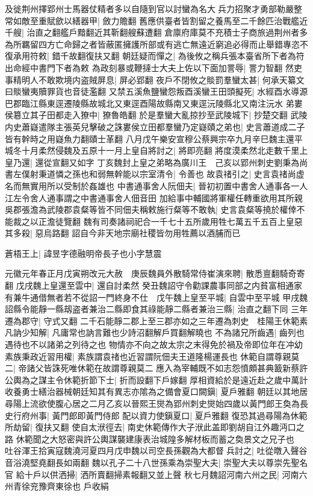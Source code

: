 及徙荆州擇郢州士馬器仗精者多以自隨到官以討蠻為名大兵力招聚才勇部勒嚴整常如敵至重賦歛以繕器甲|{
	斂力贍翻}
舊應供臺者皆割留之養馬至二千餘匹治戰艦近千艘|{
	治直之翻艦戶黯翻近其靳翻艘蘇遭翻}
倉廪府庫莫不充積士子商旅過荆州者多為所羈留四方亡命歸之者皆蔽匿擁護所部或有逃亡無遠近窮追必得而止舉錯專恣不復承用符敕|{
	錯千故翻復扶又翻}
朝廷疑而憚之|{
	為後攸之稱兵張本臺省所下者為符出命經中書門下者為敕}
為政刻暴或鞭撻士大夫上佐以下面加詈辱|{
	詈力智翻}
然吏事精明人不敢欺境内盗賊屏息|{
	屏必郢翻}
夜戶不閉攸之賧罰羣蠻太甚|{
	何承天纂文曰賧蠻夷贖罪貨也音徒濫翻}
又禁五溪魚鹽蠻怨叛酉溪蠻王田頭擬死|{
	水經酉水導源巴郡臨江縣東逕遷陵縣故城北又東逕酉陽故縣南又東逕沅陵縣北又南注沅水}
弟婁侯簒立其子田都走入獠中|{
	獠魯皓翻}
於是羣蠻大亂掠抄至武陵城下|{
	抄楚交翻}
武陵内史蕭嶷遣隊主張英兒擊破之誅婁侯立田都羣蠻乃定嶷賾之弟也|{
	史言蕭道成二子皆有幹時之用嶷魚力翻賾士革翻}
八月戊午樂安宣穆公蔡興宗卒九月辛巳魏主還平城冬十月柔然侵魏及五原十一月上皇自將討之|{
	將即亮翻}
將度漠柔然北走數千里上皇乃還|{
	還從宣翻又如字}
丁亥魏封上皇之弟略為廣川王　己亥以郢州刺史劉秉為尚書左僕射秉道憐之孫也和弱無幹能以宗室清令|{
	令善也}
故袁禇引之|{
	史言袁禇尚虚名而無實用所以受制於姦雄也}
中書通事舍人阮佃夫|{
	晉初初置中書舍人通事各一人江左令舍人通事謂之中書通事舍人佃音田}
加給事中輔國將軍權任轉重欲用其所親吳郡張澹為武陵郡袁粲等皆不同佃夫稱敕施行粲等不敢執|{
	史言袁粲等撓於權倖不能裁之以正澹徒覽翻}
魏有司奏諸祠祀合一千七十五所歲用牲七萬五千五百上皇惡其多殺|{
	惡烏路翻}
詔自今非天地宗廟社稷皆勿用牲薦以酒脯而已

蒼梧王上|{
	諱昱字德融明帝長子也小字慧震}


元徽元年春正月戊寅朔改元大赦　庚辰魏員外散騎常侍崔演來聘|{
	散悉亶翻騎奇寄翻}
戊戌魏上皇還至雲中|{
	還自討柔然}
癸丑魏詔守令勸課農事同部之内貧富相通家有兼牛通借無者若不從詔一門終身不仕　戊午魏上皇至平城|{
	自雲中至平城}
甲戌魏詔縣令能靜一縣刼盗者兼治二縣即食其祿能靜二縣者兼治三縣|{
	治直之翻下同}
三年遷為郡守|{
	守式又翻}
二千石能靜二郡上至三郡亦如之三年遷為刺史　桂陽王休範素凡訥少知解|{
	凡庸常也訥言難也少詩沼翻解戶買翻解曉也}
不為諸兄所齒遇|{
	齒列也遇待也不以諸弟之列待之也}
物情亦不向之故太宗之末得免於禍及帝即位年在冲幼素族秉政近習用權|{
	素族謂袁禇也近習謂阮佃夫王道隆楊運長也}
休範自謂尊親莫二|{
	帝諸父皆誅死唯休範在故謂尊親莫二}
應入為宰輔既不如志怨憤頗甚典籖新蔡許公輿為之謀主令休範折節下士|{
	折而設翻下戶嫁翻}
厚相資給於是遠近赴之歲中萬計收養勇士繕治器械朝廷知其有異志亦隂為之備會夏口闕鎭|{
	夏戶雅翻}
朝廷以其地居尋陽上流欲使腹心居之二月乙亥以晉熙王爕為郢州刺史爕始四歲以黃門郎王奐為長史行府州事|{
	黃門郎即黃門侍郎}
配以資力使鎭夏口|{
	夏戶雅翻}
復恐其過尋陽為休範所劫留|{
	復扶又翻}
使自太洑徑去|{
	南史休範傳作大子洑此盖即劉胡自江外趣沔口之路}
休範聞之大怒密與許公輿謀襲建康表治城隍多解材板而蓄之奐景文之兄子也　吐谷渾王拾寅寇魏澆河夏四月戊申魏以司空長孫觀為大都督兵討之|{
	吐從暾入聲谷音浴澆堅堯翻長如兩翻}
魏以孔子二十八世孫乘為崇聖大夫|{
	崇聖大夫以尊崇先聖名官}
給十戶以供洒掃|{
	洒所賣翻掃素報翻又並上聲}
秋七月魏詔河南六州之民|{
	河南六州青徐兖豫齊東徐也}
戶收絹

